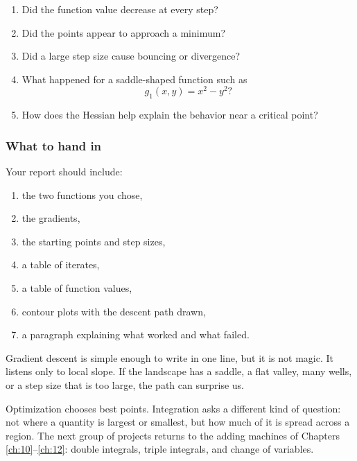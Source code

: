 \begin{enumerate}
\item Did the function value decrease at every step?

\item Did the points appear to approach a minimum?

\item Did a large step size cause bouncing or divergence?

\item What happened for a saddle-shaped function such as
\[
    g_1(x,y)=x^2-y^2?
\]

\item How does the Hessian help explain the behavior near a critical point?
\end{enumerate}

\subsubsection*{What to hand in}

Your report should include:

\begin{enumerate}
\item the two functions you chose,

\item the gradients,

\item the starting points and step sizes,

\item a table of iterates,

\item a table of function values,

\item contour plots with the descent path drawn,

\item a paragraph explaining what worked and what failed.
\end{enumerate}

Gradient descent is simple enough to write in one line, but it is not magic.  It listens
only to local slope.  If the landscape has a saddle, a flat valley, many wells, or a step
size that is too large, the path can surprise us.

Optimization chooses best points.  Integration asks a different kind of question: not
where a quantity is largest or smallest, but how much of it is spread across a region.
The next group of projects returns to the adding machines of Chapters
\ref{ch:10}--\ref{ch:12}: double integrals, triple integrals, and change of variables.


